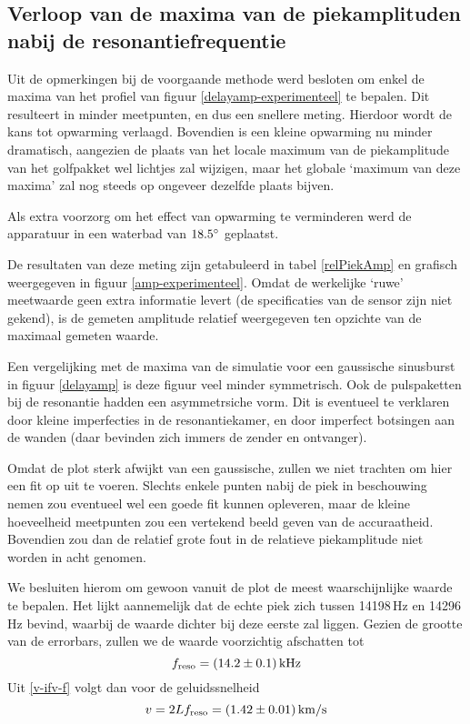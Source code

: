 \subsection{Verloop van de maxima van de piekamplituden nabij de 
resonantiefrequentie}
Uit de opmerkingen bij de voorgaande methode werd besloten om enkel de 
maxima van het profiel van figuur \ref{delayamp-experimenteel} te bepalen.  
Dit resulteert in minder meetpunten, en dus een snellere meting. Hierdoor 
wordt de kans tot opwarming verlaagd. Bovendien is een kleine opwarming nu 
minder dramatisch, aangezien de plaats van het locale maximum van de 
piekamplitude van het golfpakket wel lichtjes zal wijzigen, maar het 
globale `maximum van deze maxima' zal nog steeds op ongeveer dezelfde 
plaats bijven.

Als extra voorzorg om het effect van opwarming te verminderen werd de 
apparatuur in een waterbad van $18.5^\circ$ geplaatst.

De resultaten van deze meting zijn getabuleerd in tabel \ref{relPiekAmp} en 
grafisch weergegeven in figuur \ref{amp-experimenteel}. Omdat de werkelijke 
`ruwe' meetwaarde geen extra informatie levert (de specificaties van de 
sensor zijn niet gekend), is de gemeten amplitude relatief weergegeven ten 
opzichte van de maximaal gemeten waarde.

\relPiekAmp
{}

Een vergelijking met de maxima van de simulatie voor een gaussische 
sinusburst in figuur \ref{delayamp} is deze figuur veel minder symmetrisch.  
Ook de pulspaketten bij de resonantie hadden een asymmetrsiche vorm. Dit is 
eventueel te verklaren door kleine imperfecties in de resonantiekamer, en 
door imperfect botsingen aan de wanden (daar bevinden zich immers de zender 
en ontvanger).

Omdat de plot sterk afwijkt van een gaussische, zullen we niet trachten om 
hier een fit op uit te voeren. Slechts enkele punten nabij de piek in 
beschouwing nemen zou eventueel wel een goede fit kunnen opleveren, maar de 
kleine hoeveelheid meetpunten zou een vertekend beeld geven van de 
accuraatheid. Bovendien zou dan de relatief grote fout in de relatieve 
piekamplitude niet worden in acht genomen.

We besluiten hierom om gewoon vanuit de plot de meest waarschijnlijke 
waarde te bepalen. Het lijkt aannemelijk dat de echte piek zich tussen
14198\,Hz en 14296\,Hz bevind, waarbij de waarde dichter bij deze eerste 
zal liggen. Gezien de grootte van de errorbars, zullen we de waarde 
voorzichtig afschatten tot
$$
f_\mathrm{reso} = (14.2 \pm 0.1)\,\rm kHz
$$
Uit \ref{v-ifv-f} volgt dan voor de geluidssnelheid
$$
v = 2Lf_\mathrm{reso}
= (1.42 \pm 0.01)\,\rm km/s
$$

